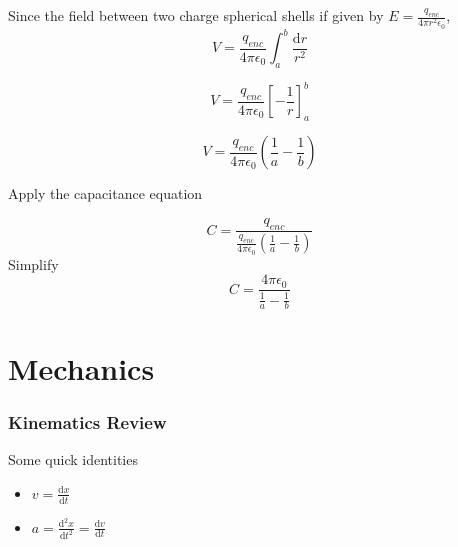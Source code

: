 \documentclass[a4paper,12pt]{article}
\begin{document}
				Since the field between two charge spherical shells if given by $E = \frac{q_{enc}}{4 \pi r^{2}\epsilon_{0}}$, 
				\begin{equation*}
						V = \frac{q_{enc}}{4 \pi \epsilon_{0}} \int_{a}^{b} \frac{\mathrm{d}r}{r^{2}}
				\end{equation*}

				\begin{equation*}
						V = \frac{q_{enc}}{4 \pi \epsilon_{0}} \left[ -\frac{1}{r} \right]_{a}^{b}
				\end{equation*}

				\begin{equation*}
						V =  \frac{q_{enc}}{4 \pi \epsilon_{0}} \left(\frac{1}{a} - \frac{1}{b}\right) 
				\end{equation*}

				Apply the capacitance equation

				\begin{equation*}
						C = \frac{q_{enc}}{\frac{q_{enc}}{4 \pi \epsilon_{0}} \left(\frac{1}{a} - \frac{1}{b}\right)} 
				\end{equation*}
				Simplify
				\begin{equation*}
						C = \frac{4\pi \epsilon_{0}}{\frac{1}{a} - \frac{1}{b}}	
				\end{equation*}

\setcounter{section}{0}
\setcounter{subsection}{0}
\setcounter{subsubsection}{0}
\newpage
\part{Mechanics}
		\section{Kinematics Review}
		Some quick identities
		\begin{itemize}
				\item $v = \frac{\mathrm{d}x}{\mathrm{d}t}$
				\item $a = \frac{\mathrm{d}^{2}x}{\mathrm{d}t^{2}} = \frac{\mathrm{d}v}{\mathrm{d}t}$
		\end{itemize}
\end{document}
